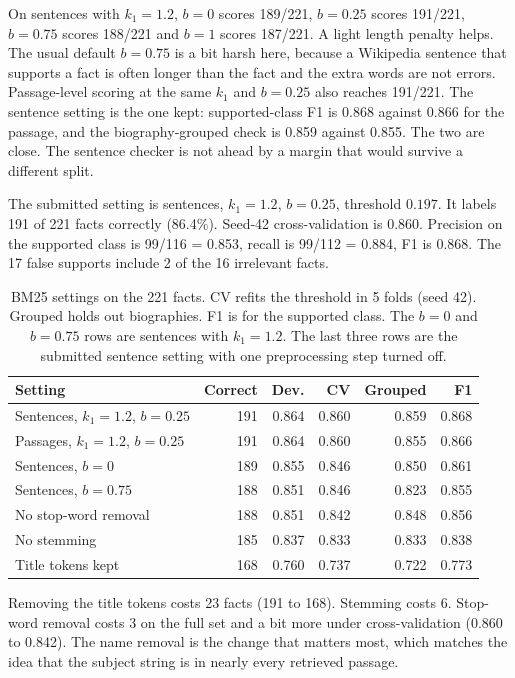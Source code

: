 \documentclass[12pt,a4paper]{article}
\begin{document}
On sentences with $k_1 = 1.2$, $b = 0$ scores 189/221, $b = 0.25$ scores 191/221, $b = 0.75$ scores 188/221 and $b = 1$ scores 187/221. A light length penalty helps. The usual default $b = 0.75$ is a bit harsh here, because a Wikipedia sentence that supports a fact is often longer than the fact and the extra words are not errors. Passage-level scoring at the same $k_1$ and $b = 0.25$ also reaches 191/221. The sentence setting is the one kept: supported-class F1 is 0.868 against 0.866 for the passage, and the biography-grouped check is 0.859 against 0.855. The two are close. The sentence checker is not ahead by a margin that would survive a different split.

The submitted setting is sentences, $k_1 = 1.2$, $b = 0.25$, threshold $0.197$. It labels 191 of 221 facts correctly (86.4\%). Seed-42 cross-validation is 0.860. Precision on the supported class is 99/116 = 0.853, recall is 99/112 = 0.884, F1 is 0.868. The 17 false supports include 2 of the 16 irrelevant facts.

\begin{table}[H]
\centering
\small
\begin{tabular}{lrrrrr}
\toprule
Setting & Correct & Dev. & CV & Grouped & F1 \\
\midrule
Sentences, $k_1{=}1.2$, $b{=}0.25$ & 191 & 0.864 & 0.860 & 0.859 & 0.868 \\
Passages, $k_1{=}1.2$, $b{=}0.25$ & 191 & 0.864 & 0.860 & 0.855 & 0.866 \\
Sentences, $b{=}0$ & 189 & 0.855 & 0.846 & 0.850 & 0.861 \\
Sentences, $b{=}0.75$ & 188 & 0.851 & 0.846 & 0.823 & 0.855 \\
No stop-word removal & 188 & 0.851 & 0.842 & 0.848 & 0.856 \\
No stemming & 185 & 0.837 & 0.833 & 0.833 & 0.838 \\
Title tokens kept & 168 & 0.760 & 0.737 & 0.722 & 0.773 \\
\bottomrule
\end{tabular}
\caption{BM25 settings on the 221 facts. CV refits the threshold in 5 folds (seed 42). Grouped holds out biographies. F1 is for the supported class. The $b = 0$ and $b = 0.75$ rows are sentences with $k_1 = 1.2$. The last three rows are the submitted sentence setting with one preprocessing step turned off.}
\label{tab:shavindu-bm25}
\end{table}

Removing the title tokens costs 23 facts (191 to 168). Stemming costs 6. Stop-word removal costs 3 on the full set and a bit more under cross-validation (0.860 to 0.842). The name removal is the change that matters most, which matches the idea that the subject string is in nearly every retrieved passage.
\end{document}
